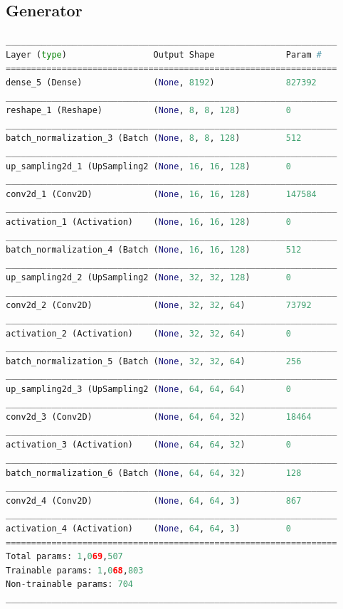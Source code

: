 \subsection{Generator} %
\label{sub:generator}
\begin{lstlisting}[basicstyle=\scriptsize,language=Python]
_________________________________________________________________
Layer (type)                 Output Shape              Param #   
=================================================================
dense_5 (Dense)              (None, 8192)              827392    
_________________________________________________________________
reshape_1 (Reshape)          (None, 8, 8, 128)         0         
_________________________________________________________________
batch_normalization_3 (Batch (None, 8, 8, 128)         512       
_________________________________________________________________
up_sampling2d_1 (UpSampling2 (None, 16, 16, 128)       0         
_________________________________________________________________
conv2d_1 (Conv2D)            (None, 16, 16, 128)       147584    
_________________________________________________________________
activation_1 (Activation)    (None, 16, 16, 128)       0         
_________________________________________________________________
batch_normalization_4 (Batch (None, 16, 16, 128)       512       
_________________________________________________________________
up_sampling2d_2 (UpSampling2 (None, 32, 32, 128)       0         
_________________________________________________________________
conv2d_2 (Conv2D)            (None, 32, 32, 64)        73792     
_________________________________________________________________
activation_2 (Activation)    (None, 32, 32, 64)        0         
_________________________________________________________________
batch_normalization_5 (Batch (None, 32, 32, 64)        256       
_________________________________________________________________
up_sampling2d_3 (UpSampling2 (None, 64, 64, 64)        0         
_________________________________________________________________
conv2d_3 (Conv2D)            (None, 64, 64, 32)        18464     
_________________________________________________________________
activation_3 (Activation)    (None, 64, 64, 32)        0         
_________________________________________________________________
batch_normalization_6 (Batch (None, 64, 64, 32)        128       
_________________________________________________________________
conv2d_4 (Conv2D)            (None, 64, 64, 3)         867       
_________________________________________________________________
activation_4 (Activation)    (None, 64, 64, 3)         0         
=================================================================
Total params: 1,069,507
Trainable params: 1,068,803
Non-trainable params: 704
_________________________________________________________________
\end{lstlisting}

